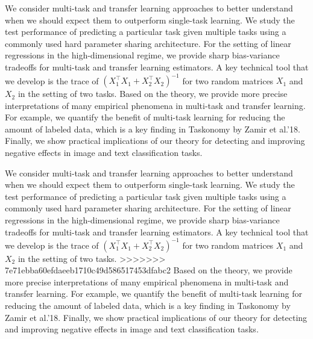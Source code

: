 	We consider multi-task and transfer learning approaches to better understand when we should expect them to outperform single-task learning.
	We study the test performance of predicting a particular task given multiple tasks using a commonly used hard parameter sharing architecture.
	For the setting of linear regressions in the high-dimensional regime, we provide sharp bias-variance tradeoffs for multi-task and transfer learning estimators.
	A key technical tool that we develop is the trace of $(X_1^{\top}X_1 + X_2^{\top}X_2)^{-1}$ for two random matrices $X_1$ and $X_2$ in the setting of two tasks.
	Based on the theory, we provide more precise interpretations of many empirical phenomena in multi-task and transfer learning.
	For example, we quantify the benefit of multi-task learning for reducing the amount of labeled data, which is a key finding in Taskonomy by Zamir et al.'18.
	Finally, we show practical implications of our theory for detecting and improving negative effects in image and text classification tasks.





	We consider multi-task and transfer learning approaches to better understand when we should expect them to outperform single-task learning.
	We study the test performance of predicting a particular task given multiple tasks using a commonly used hard parameter sharing architecture.
	For the setting of linear regressions in the high-dimensional regime, we provide sharp bias-variance tradeoffs for multi-task and transfer learning estimators.
	A key technical tool that we develop is the trace of $(X_1^{\top}X_1 + X_2^{\top}X_2)^{-1}$ for two random matrices $X_1$ and $X_2$ in the setting of two tasks.
>>>>>>> 7e71ebba60efdaeeb1710c49d586517453dfabc2
	Based on the theory, we provide more precise interpretations of many empirical phenomena in multi-task and transfer learning.
	For example, we quantify the benefit of multi-task learning for reducing the amount of labeled data, which is a key finding in Taskonomy by Zamir et al.'18.
	Finally, we show practical implications of our theory for detecting and improving negative effects in image and text classification tasks.


